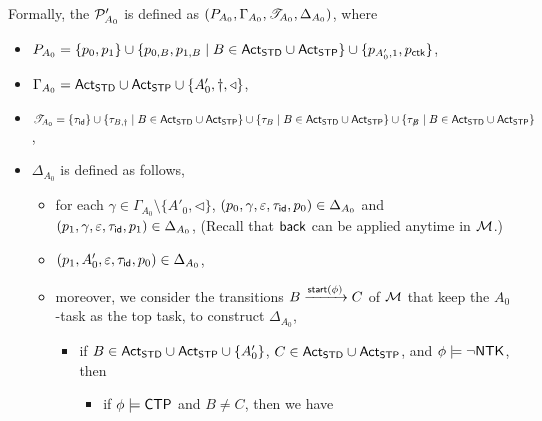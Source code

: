Formally, the {\WOTrPDS} ${\mathcal{P} }'_{A_0}$ is defined as $(P_{A_0}, \Gamma_{A_0}, {\mathscr{T} }_{A_0}, \Delta_{A_0})$, where 
\begin{itemize}
\item $P_{A_0} = \{p_0, p_1\}\cup\{ p_{0, B}, p_{1, B} \mid B \in  {\sf Act}_{\sf STD} \cup {\sf Act}_{\sf STP}\} \cup \{p_{A'_0,1}, p_{\sf ctk}\}$,
\item $\Gamma_{A_0} = {\sf Act}_{\sf STD} \cup {\sf Act}_{\sf STP} \cup \{A'_0, \dag, \triangleleft\}$, 
\item ${\mathscr{T} }_{A_0} = \{\tau_{\mathsf{id}} \}\cup \{\tau_{B, \dag} \mid B \in {\sf Act}_{\sf STD} \cup {\sf Act}_{\sf STP} \} \cup \{\tau_{B} \mid B \in {\sf Act}_{\sf STD} \cup {\sf Act}_{\sf STP}\}  \cup \{\tau_{\not B} \mid B \in {\sf Act}_{\sf STD} \cup {\sf Act}_{\sf STP}\}$, 
\item $\Delta_{A_0}$ is defined as follows,
        \begin{itemize}
            \item for each $\gamma \in \Gamma_{A_0} \setminus \{A'_0, \triangleleft\}$, $(p_0, \gamma, \varepsilon, \tau_{\mathsf{id}}, p_0) \in \Delta_{A_0}$ and $(p_1, \gamma, \varepsilon, \tau_{\mathsf{id}}, p_1) \in \Delta_{A_0}$, (Recall that ${\mathsf{back} }$ can be applied anytime in ${\mathcal{M} }$.)
            \item $(p_1, A'_0, \varepsilon, \tau_{\mathsf{id}}, p_0) \in \Delta_{A_0}$,
	    \item moreover, we consider the transitions $B \xrightarrow{{\mathsf{start} }(\phi)} C$ of ${\mathcal{M} }$ that keep the $A_0$-task as the top task, to construct $\Delta_{A_0}$, 
			\begin{itemize}
				\item if $B \in {\sf Act}_{\sf STD} \cup {\sf Act}_{\sf STP} \cup \{A'_0\}$, $C \in {\sf Act}_{\sf STD} \cup {\sf Act}_{\sf STP}$, and $\phi \models \neg {\sf NTK}$, then 
				\begin{itemize}
				\item if $\phi \models {\sf CTP}$ and $B \neq C$, then we have 

\end{itemize}
\end{itemize}
\end{itemize}
\end{itemize}

